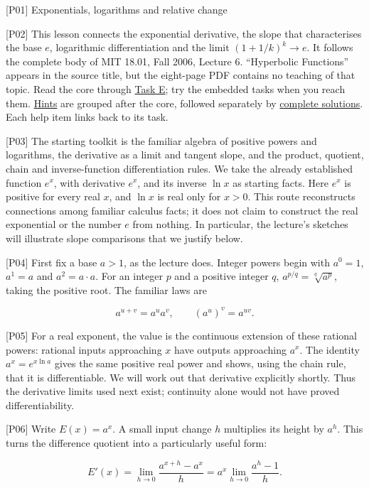 \documentclass[
  11pt,
]{article}
\author{}
\date{}
\providecommand{\gt}{>}
\begin{document}
{[}P01{]} Exponentials, logarithms and relative change

{[}P02{]} This lesson connects the exponential derivative, the slope
that characterises the base \(e\), logarithmic differentiation and the
limit \((1+1/k)^k\to e\). It follows the complete body of MIT 18.01,
Fall 2006, Lecture 6. ``Hyperbolic Functions'' appears in the source
title, but the eight-page PDF contains no teaching of that topic. Read
the core through \protect\hyperlink{task-e}{Task E}; try the embedded
tasks when you reach them. \protect\hyperlink{hints}{Hints} are grouped
after the core, followed separately by
\protect\hyperlink{solutions}{complete solutions}. Each help item links
back to its task.

{[}P03{]} The starting toolkit is the familiar algebra of positive
powers and logarithms, the derivative as a limit and tangent slope, and
the product, quotient, chain and inverse-function differentiation rules.
We take the already established function \(e^x\), with derivative
\(e^x\), and its inverse \(\ln x\) as starting facts. Here \(e^x\) is
positive for every real \(x\), and \(\ln x\) is real only for \(x\gt0\).
This route reconstructs connections among familiar calculus facts; it
does not claim to construct the real exponential or the number \(e\)
from nothing. In particular, the lecture's sketches will illustrate
slope comparisons that we justify below.

{[}P04{]} First fix a base \(a\gt1\), as the lecture does. Integer
powers begin with \(a^0=1\), \(a^1=a\) and \(a^2=a\cdot a\). For an
integer \(p\) and a positive integer \(q\), \(a^{p/q}=\sqrt[q]{a^p}\),
taking the positive root. The familiar laws are

\[
a^{u+v}=a^u a^v,\qquad (a^u)^v=a^{uv}.
\]

{[}P05{]} For a real exponent, the value is the continuous extension of
these rational powers: rational inputs approaching \(x\) have outputs
approaching \(a^x\). The identity \(a^x=e^{x\ln a}\) gives the same
positive real power and shows, using the chain rule, that it is
differentiable. We will work out that derivative explicitly shortly.
Thus the derivative limits used next exist; continuity alone would not
have proved differentiability.

{[}P06{]} Write \(E(x)=a^x\). A small input change \(h\) multiplies its
height by \(a^h\). This turns the difference quotient into a
particularly useful form:

\[
E'(x)=\lim_{h\to0}\frac{a^{x+h}-a^x}{h}
=a^x\lim_{h\to0}\frac{a^h-1}{h}.
\]
\end{document}
